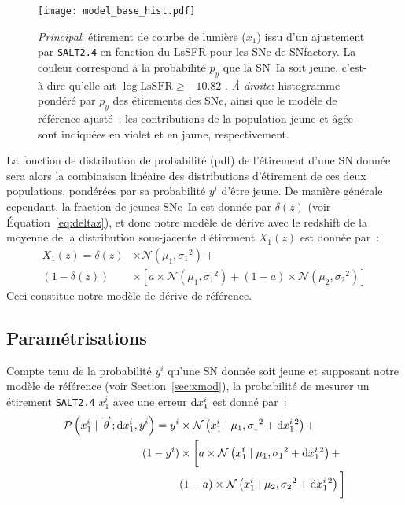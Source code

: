 \documentclass[../main/main.tex]{subfiles}
\begin{document}
\begin{figure*}
    \centering
    \texttt{[image: model\_base\_hist.pdf]}
    \caption[Étirement en fonction du LsSFR des SNe~Ia de SNfactory et modèles
    d'étirement de référence ajustés]{\textit{Principal}: étirement de courbe de
        lumière ($x_1$) issu d'un ajustement par \textsc{\texttt{SALT2.4}} en
        fonction du LsSFR pour les SNe de SNfactory. La couleur correspond à la
        probabilité $p_y$ que la SN~Ia soit jeune, c'est-à-dire qu'elle ait
        $\log\mathrm{LsSFR} \geq -10.82$ \citep[voir][]{rigault2020}. \textit{À
        droite}: histogramme pondéré par $p_y$ des étirements des SNe, ainsi que
        le modèle de référence ajusté~; les contributions de la population jeune
    et âgée sont indiquées en violet et en jaune, respectivement.}
    \label{fig:stretchlssfr}
\end{figure*}

La fonction de distribution de probabilité (pdf) de l'étirement d'une SN donnée
sera alors la combinaison linéaire des distributions d'étirement de ces deux
populations, pondérées par sa probabilité $y^i$ d'être jeune. De manière
générale cependant, la fraction de jeunes SNe~Ia est donnée par $\delta(z)$
(voir Équation~\ref{eq:deltaz}), et donc notre modèle de dérive avec le redshift
de la moyenne de la distribution sous-jacente d'étirement $X_1(z)$ est donnée
par~:
\begin{align}\label{eq:stretchz}
    X_1(z) = \delta(z)&\times \mathcal{N}(\mu_1,\sigma_1{}^2) + \nonumber \\
    (1-\delta(z))&\times \left[ a\times\mathcal{N}(\mu_1,\sigma_1{}^2) +
    (1-a)\times\mathcal{N}(\mu_2,\sigma_2{}^2) \right]
\end{align}
Ceci constitue notre modèle de dérive de référence.

\subsection{Paramétrisations}\label{ssec:pmod}

Compte tenu de la probabilité $y^i$ qu'une SN donnée soit jeune et supposant
notre modèle de référence (voir Section~\ref{sec:xmod}), la probabilité de
mesurer un étirement \texttt{SALT2.4} $x_1^i$ avec une erreur $\mathrm{d} x_1^i$ est
donné par~:
\begin{align}\label{eq:likelihoodsnf}
    \mathcal{P}\left(x^i_1 \mid \overrightarrow{\theta}; \mathrm{d}x^i_1, y^i\right) =
    y^i & \times
    \mathcal{N}\left(x^i_1 \mid \mu_1, \sigma_1{}^2+\mathrm{d}x^i_1{}^2\right) +
    \nonumber\\
    (1-y^i) &\times \bigg[
    a \times \mathcal{N}\left(x^i_1 \mid \mu_1,
    \sigma_1{}^2+\mathrm{d}x^i_1{}^2\right) +
    \nonumber\\
    & (1-a) \times \mathcal{N}\left(x^i_1 \mid \mu_2,
    \sigma_2{}^{2}+\mathrm{d}x^i_1{}^2\right) \bigg]
\end{align}
\end{document}
